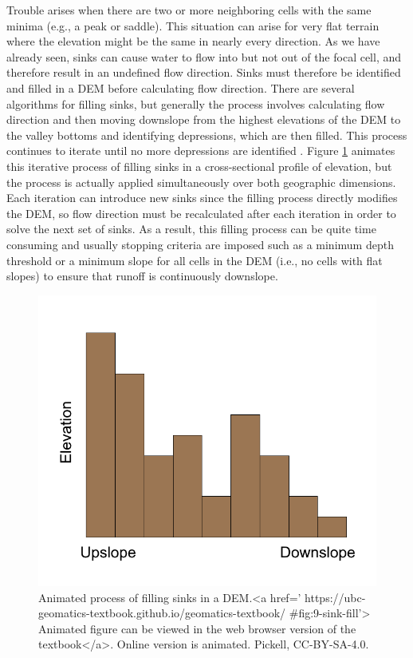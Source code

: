 \documentclass[
]{book}
\begin{document}
Trouble arises when there are two or more neighboring cells with the same minima (e.g., a peak or saddle). This situation can arise for very flat terrain where the elevation might be the same in nearly every direction. As we have already seen, sinks can cause water to flow into but not out of the focal cell, and therefore result in an undefined flow direction. Sinks must therefore be identified and filled in a DEM before calculating flow direction. There are several algorithms for filling sinks, but generally the process involves calculating flow direction and then moving downslope from the highest elevations of the DEM to the valley bottoms and identifying depressions, which are then filled. This process continues to iterate until no more depressions are identified \citep{marks_automated_1984}. Figure \ref{fig:9-sink-fill} animates this iterative process of filling sinks in a cross-sectional profile of elevation, but the process is actually applied simultaneously over both geographic dimensions. Each iteration can introduce new sinks since the filling process directly modifies the DEM, so flow direction must be recalculated after each iteration in order to solve the next set of sinks. As a result, this filling process can be quite time consuming and usually stopping criteria are imposed such as a minimum depth threshold or a minimum slope for all cells in the DEM (i.e., no cells with flat slopes) to ensure that runoff is continuously downslope.

\begin{figure}
\includegraphics[width=0.75\linewidth]{images/09-sink-fill} \caption{Animated process of filling sinks in a DEM.<a href=' https://ubc-geomatics-textbook.github.io/geomatics-textbook/ #fig:9-sink-fill'> Animated figure can be viewed in the web browser version of the textbook</a>. Online version is animated. Pickell, CC-BY-SA-4.0.}\label{fig:9-sink-fill}
\end{figure}
\end{document}
